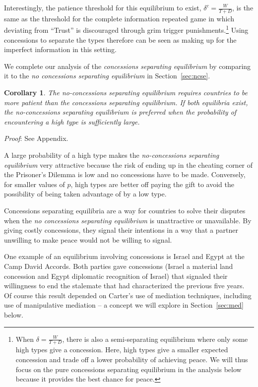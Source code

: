 \documentclass[12pt, letterpaper]{article}
\newcommand{\de}{\delta}
\newtheorem{corollary}{Corollary}
\begin{document}
Interestingly, the patience threshold for this equilibrium to exist, $\de^c = \frac{W}{T+D}$, is the same as the threshold for the complete information repeated game in which deviating from ``Trust'' is discouraged through grim trigger punishments.\footnote{When $\de = \frac{W}{T+D}$, there is also a semi-separating equilibrium where only some high types give a concession. Here, high types give a smaller expected concession and trade off a lower probability of achieving peace. We will thus focus on the pure concessions separating equilibrium in the analysis below because it provides the best chance for peace.} Using concessions to separate the types therefore can be seen as making up for the imperfect information in this setting.

We complete our analysis of the \emph{concessions separating equilibrium} by comparing it to the \emph{no concessions separating equilibrium} in Section~\ref{sec:ncse}.

\begin{corollary}
	The \emph{no-concessions separating equilibrium} requires countries to be more patient than the \emph{concessions separating equilibrium}. If both equilibria exist, the \emph{no-concessions separating equilibrium} is preferred when the probability of encountering a high type is sufficiently large.
	\label{corollary:1}
\end{corollary}
\emph{Proof}: See Appendix.

A large probability of a high type makes the \emph{no-concessions separating equilibrium} very attractive because the risk of ending up in the cheating corner of the Prisoner's Dilemma is low and no concessions have to be made. Conversely, for smaller values of $p$, high types are better off paying the gift to avoid the possibility of being taken advantage of by a low type.

Concessions separating equilibria are a way for countries to solve their disputes when the \emph{no concessions separating equilibrium} is unattractive or unavailable. By giving costly concessions, they signal their intentions in a way that a partner unwilling to make peace would not be willing to signal. 

One example of an equilibrium involving concessions is Israel and Egypt at the Camp David Accords. Both parties gave concessions (Israel a material land concession and Egypt diplomatic recognition of Israel) that signaled their willingness to end the stalemate that had characterized the previous five years. Of course this result depended on Carter's use of mediation techniques, including use of manipulative mediation -- a concept we will explore in Section~\ref{sec:med} below. 
\end{document}
